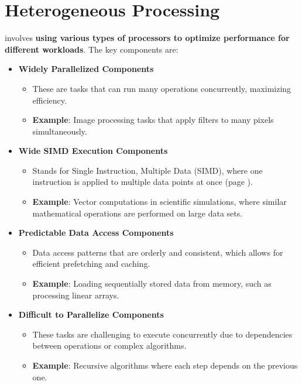 \section{Heterogeneous Processing}

 involves \textbf{using various types of processors to optimize performance for different workloads}. The key components are:
\begin{itemize}
    \item \textbf{Widely Parallelized Components}
    \begin{itemize}
        \item These are tasks that can run many operations concurrently, maximizing efficiency.
        \item \textcolor{Green3}{\textbf{Example}}: Image processing tasks that apply filters to many pixels simultaneously.
    \end{itemize}
 
    \item \textbf{Wide SIMD Execution Components}
    \begin{itemize}
        \item Stands for Single Instruction, Multiple Data (SIMD), where one instruction is applied to multiple data points at once (page \pageref{subsubsection: Single Instruction, Multiple Data (SIMD) processor}).
        \item \textcolor{Green3}{\textbf{Example}}: Vector computations in scientific simulations, where similar mathematical operations are performed on large data sets.
    \end{itemize}
 
    \item \textbf{Predictable Data Access Components}
    \begin{itemize}
        \item Data access patterns that are orderly and consistent, which allows for efficient prefetching and caching.
        \item \textcolor{Green3}{\textbf{Example}}: Loading sequentially stored data from memory, such as processing linear arrays.
    \end{itemize}
 
    \item \textbf{Difficult to Parallelize Components}
    \begin{itemize}
        \item These tasks are challenging to execute concurrently due to dependencies between operations or complex algorithms.
        \item \textcolor{Green3}{\textbf{Example}}: Recursive algorithms where each step depends on the previous one.
    \end{itemize}
 

\end{itemize}
